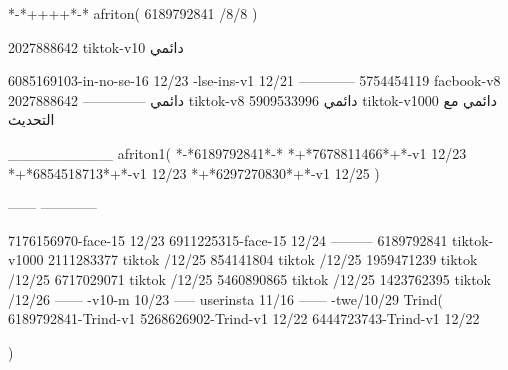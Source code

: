 *-*++++*-*
afriton(
6189792841 /8/8
)

2027888642 tiktok-v10
دائمي

6085169103-in-no-se-16 12/23
-lse-ins-v1 12/21
------------
5754454119 facbook-v8
دائمي
--------------
2027888642 tiktok-v8
دائمي
5909533996 tiktok-v1000
دائمي مع التحديث

__________
afriton1(
*-*6189792841*-*
*+*7678811466*+*-v1 12/23
*+*6854518713*+*-v1 12/23
*+*6297270830*+*-v1 12/25
)

------
------------

7176156970-face-15 12/23
6911225315-face-15 12/24
---------
6189792841 tiktok-v1000
2111283377 tiktok /12/25
854141804 tiktok /12/25
1959471239 tiktok /12/25
6717029071 tiktok /12/25
5460890865 tiktok /12/25
1423762395 tiktok /12/26
------
-v10-m 10/23
-----
userinsta 11/16
------
-twe/10/29
Trind(
6189792841-Trind-v1 
5268626902-Trind-v1 12/22
6444723743-Trind-v1 12/22

)
